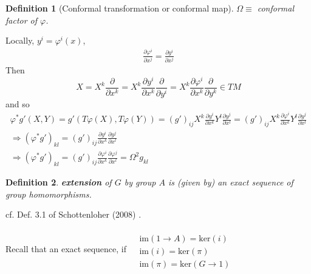 \documentclass[10pt]{amsart}
\newtheorem{definition}{Definition}
\begin{document}
\begin{multicols*}{2}
\begin{definition}[Conformal transformation or conformal map]
$\Omega \equiv $ \emph{conformal factor} of $\varphi$.  
\end{definition}

Locally, $y^i = \varphi^i(x)$, \[
\begin{gathered}
	\frac{ \partial \varphi^i }{ \partial x^j} = \frac{ \partial y^i }{ \partial x^j}
\end{gathered}	
\]
Then
\[
X = X^k \frac{ \partial }{ \partial x^k} = X^k \frac{ \partial y^i }{ \partial x^k} \frac{ \partial }{ \partial y^i } = X^k \frac{ \partial \varphi^i }{ \partial x^k} \frac{ \partial }{ \partial y^k} \in TM
\]
and so 
\[
\begin{gathered}
	\varphi^* g'(X,Y) = g'(T\varphi(X), T\varphi(Y)) = (g')_{ij} X^k \frac{ \partial y^i }{ \partial x^k} Y^l \frac{ \partial y^j }{ \partial x^l} = (g')_{ij} X^k \frac{ \partial \varphi^i }{ \partial x^k } Y^l \frac{ \partial y^j}{ \partial x^l} \\ 
\Longrightarrow (\varphi^* g')_{kl} = (g')_{ij} \frac{ \partial y^i }{ \partial x^k } \frac{ \partial y^j}{ \partial x^l } \\ 
\Longrightarrow (\varphi^* g')_{kl} = (g')_{ij} \frac{ \partial \varphi^i }{ \partial x^k} \frac{ \partial \varphi^j}{ \partial x^l} = \Omega^2 g_{kl}
\end{gathered}
\]



\begin{definition}
	\textbf{extension} of $G$ by group $A$ is (given by) an \emph{exact sequence} of group homomorphisms.  
\end{definition}
cf. Def. 3.1 of Schottenloher (2008)  \cite{Scho2008}.  

Recall that an exact sequence, if $\begin{aligned} & \quad \\
	& \text{im}(1\to A) = \text{ker}(i) \\
	& \text{im}(i) = \text{ker}(\pi) \\
	& \text{im}(\pi) = \text{ker}(G\to 1)
\end{aligned}$


\end{multicols*}
\end{document}
